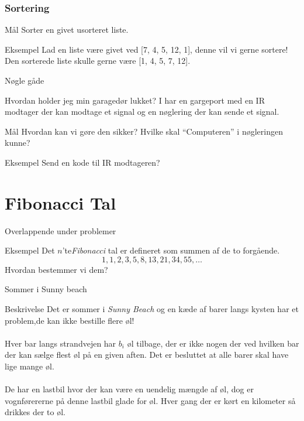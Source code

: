 \documentclass[12pt,t]{beamer}
\begin{document}
    \begin{frame}
      \frametitle{Sortering}
      \begin{block}{Mål}
          Sorter en givet usorteret liste.
      \end{block}
      \pause

      \begin{exampleblock}{Eksempel}
      Lad en liste være givet ved [7, 4, 5, 12, 1], denne vil vi gerne sortere!
      Den sorterede liste skulle gerne være [1, 4, 5, 7, 12].
      \end{exampleblock}
    \end{frame}


    \begin{frame}{Nøgle gåde}
    \begin{block}{Hvordan holder jeg min garagedør lukket?}
        I har en gargeport med en IR modtager der kan modtage et
        signal og en nøglering der kan sende et signal.
    \end{block}\pause
      \begin{block}{Mål}
        Hvordan kan vi gøre den sikker? Hvilke skal ``Computeren'' i
        nøgleringen kunne?
      \end{block}
      \pause
      \begin{exampleblock}{Eksempel}
        Send en kode til IR modtageren?
      \end{exampleblock}
    \end{frame}


\section{Fibonacci Tal}
    \begin{frame}[c]{Overlappende under problemer}
        \begin{block}{Eksempel}
            Det $n$'te\emph{Fibonacci} tal er defineret som summen af de to
            forgående.
            $$
              1,1,2,3,5,8,13,21,34,55, \dots
            $$
            \pause
            Hvordan bestemmer vi dem?
        \end{block}
    \end{frame}

\begin{frame}[c]{Sommer i Sunny beach}
    \begin{block}{Beskrivelse}
      Det er sommer i \emph{Sunny Beach} og en kæde af barer langs kysten
      har et problem,\pause  de kan ikke bestille flere øl!
      \\
      \pause  ~ \\
      Hver bar langs strandvejen har $b_i$ øl tilbage, der er ikke
      nogen der ved hvilken bar der kan sælge flest øl på en given aften.
      \pause
      Det er besluttet at alle barer skal have lige mange øl. \\
      \pause
      ~\\
      De har en lastbil hvor der kan være en uendelig mængde af øl, \pause
      dog er vognførererne på denne lastbil glade for øl. Hver gang der er
      kørt en kilometer så drikkes der to øl.
    \end{block}
\end{frame}
\end{document}

